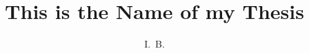 \documentclass[defaultstyle,11pt]{thesis}
\title{This is the Name of my Thesis}
\author{I.~B.}{Scriptor}
\begin{document}




\nocite{*}		%

\appendix


\end{document}
